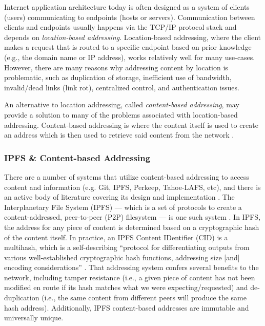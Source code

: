 \documentclass{textile}
\begin{document}
Internet application architecture today is often designed as a system of clients (users) communicating to endpoints (hosts or servers). Communication between clients and endpoints usually happens via the TCP/IP protocol stack and depends on \emph{location-based addressing}. Location-based addressing, where the client makes a request that is routed to a specific endpoint based on prior knowledge (e.g., the domain name or IP address), works relatively well for many use-cases. However, there are many reasons why addressing content by location is problematic, such as duplication of storage, inefficient use of bandwidth, invalid/dead links (link rot), centralized control, and authentication issues.

An alternative to location addressing, called \emph{content-based addressing}, may provide a solution to many of the problems associated with location-based addressing. Content-based addressing is where the content itself is used to create an address which is then used to retrieve said content from the network \cite{mortContentBasedAddressing2012}.

\subsubsection{IPFS \& Content-based Addressing}

There are a number of systems that utilize content-based addressing to access content and information (e.g. Git, IPFS, Perkeep, Tahoe-LAFS, etc), and there is an active body of literature covering its design and implementation \cite{benetIPFSContentAddressed2014,selimi_tahoeLafs_2014,rhea_fast_2008}. The Interplanetary File System (IPFS) --- which is a set of protocols to create a content-addressed, peer-to-peer (P2P) filesystem --- is one such system \cite{benetIPFSContentAddressed2014}. In IPFS, the address for any piece of content is determined based on a cryptographic hash of the content itself. In practice, an IPFS Content IDentifier (CID) is a multihash, which is a self-describing ``protocol for differentiating outputs from various well-established cryptographic hash functions, addressing size [and] encoding considerations'' \cite{protocollabsMultihash}. That addressing system confers several benefits to the network, including tamper resistance (i.e., a given piece of content has not been modified en route if its hash matches what we were expecting/requested) and de-duplication (i.e., the same content from different peers will produce the same hash address). Additionally, IPFS content-based addresses are immutable and universally unique.
\end{document}
